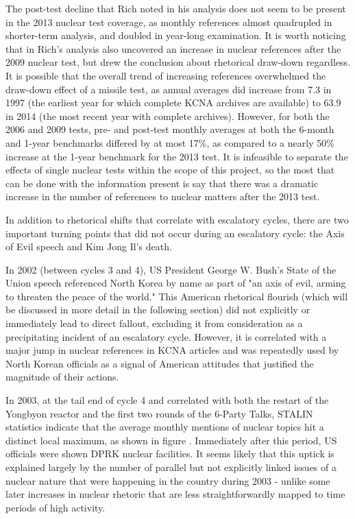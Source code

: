 \documentclass{article}
\begin{document}
The post-test decline that Rich\cite{rich14} noted in his analysis does not seem to be present in the 2013 nuclear test coverage, as monthly references almost quadrupled in shorter-term analysis, and doubled in year-long examination. It is worth noticing that in Rich's analysis also uncovered an increase in nuclear references after the 2009 nuclear test, but drew the conclusion about rhetorical draw-down regardless. It is possible that the overall trend of increasing references overwhelmed the draw-down effect of a missile test, as annual averages did increase from 7.3 in 1997 (the earliest year for which complete KCNA archives are available) to 63.9 in 2014 (the most recent year with complete archives). However, for both the 2006 and 2009 tests, pre- and post-test monthly averages at both the 6-month and 1-year benchmarks differed by at most 17\%, as compared to a nearly 50\% increase at the 1-year benchmark for the 2013 test. It is infeasible to separate the effects of single nuclear tests within the scope of this project, so the most that can be done with the information present is say that there was a dramatic increase in the number of references to nuclear matters after the 2013 test.

In addition to rhetorical shifts that correlate with escalatory cycles, there are two important turning points that did not occur during an escalatory cycle: the Axis of Evil speech and Kim Jong Il's death.

In 2002 (between cycles 3 and 4), US President George W. Bush's State of the Union speech referenced North Korea by name as part of "an axis of evil, arming to threaten the peace of the world."\cite{sotu02} This American rhetorical flourish (which will be discussed in more detail in the following section) did not explicitly or immediately lead to direct fallout, excluding it from consideration as a precipitating incident of an escalatory cycle. However, it is correlated with a major jump in nuclear references in KCNA articles \cite{rich14} and was repeatedly used by North Korean officials as a signal of American attitudes that justified the magnitude of their actions\cite{bleiker}.

In 2003, at the tail end of cycle 4 and correlated with both the restart of the Yongbyon reactor and the first two rounds of the 6-Party Talks, STALIN statistics indicate that the average monthly mentions of nuclear topics hit a distinct local maximum, as shown in figure . Immediately after this period, US officials were shown DPRK nuclear facilities. It seems likely that this uptick is explained largely by the number of parallel but not explicitly linked issues of a nuclear nature that were happening in the country during 2003 - unlike some later increases in nuclear rhetoric that are less straightforwardly mapped to time periods of high activity.
\end{document}
